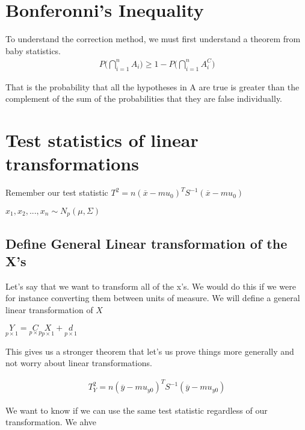 \section{Bonferonni's Inequality}
To understand the correction method, we must first understand a theorem from baby statistics.
\begin{gather*}
    P\big(\bigcap^n_{i=1} A_i\big) \geq 1- P\big(\bigcap^n_{i=1} A_i^C\big) 
\end{gather*}

That is the probability that all the hypotheses in A are true is greater than the complement of the sum of the probabilities that they are false individually.

\section{Test statistics of linear transformations}
Remember our test statistic $T^2 = n(\overline{x}-mu_0)^TS^{-1}(\overline{x}-mu_0)$

$x_1,x_2,...,x_n \sim N_p (\mu ,\Sigma)$

\subsection{Define General Linear transformation of the X's}
Let's say that we want to transform all of the x's. We would do this if we were for instance converting them between units of measure. We will define a general linear transformation of $X$

$\underset{p\times 1}{Y} = \underset{p\times p}{C}\underset{p\times 1}{X} + \underset{p\times 1}{d}$

This gives us a stronger theorem that let's us prove things more generally and not worry about linear transformations.

\begin{gather*}
    T^2_Y = n(\overline{y}-mu_{y0})^TS^{-1}(\overline{y}-mu_{y0}) 
\end{gather*}

We want to know if we can use the same test statistic regardless of our transformation. We ahve

